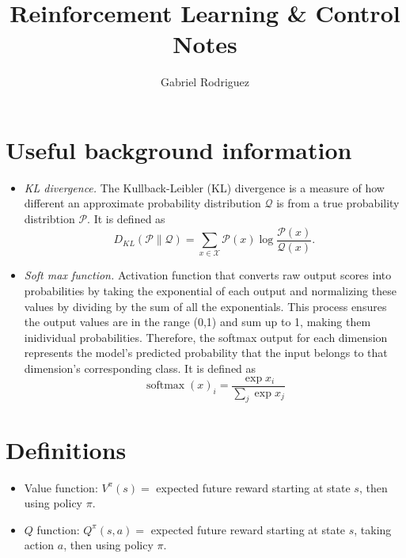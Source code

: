 \documentclass[11pt,a4paper]{article}
\title{Reinforcement Learning \& Control Notes}
\author{Gabriel Rodriguez}
\begin{document}
\maketitle

\section{Useful background information}

\begin{itemize}
    \item \textit{KL divergence.} The Kullback-Leibler (KL) divergence is a measure of how different an approximate probability distribution $\mathcal{Q}$ is from a true probability distribtion $\mathcal{P}$. It is defined as 
    \begin{equation}
      D_{KL}(\mathcal{P} \| \mathcal{Q}) = \sum_{x\in\mathcal{X}} \mathcal{P}(x) \log \frac{\mathcal{P}(x)}{\mathcal{Q}(x)}.
    \end{equation}
    \item \textit{Soft max function.} Activation function that converts raw output scores into probabilities by taking the exponential of each output and normalizing these values by dividing by the sum of all the exponentials. This process ensures the output values are in the range (0,1) and sum up to 1, making them inidividual probabilities. Therefore, the softmax output for each dimension represents the model's predicted probability that the input belongs to that dimension's corresponding class. It is defined as 
    \begin{equation}
      \operatorname{softmax}(x)_i = \frac{\exp{x_i}}{\sum_j \exp{x_j}}
    \end{equation}
\end{itemize}

\section{Definitions}
\begin{itemize}
  \item Value function: $V^\pi(s) = $ expected future reward starting at state $s$, then using policy $\pi$.
  \item $Q$ function: $Q^\pi(s, a) = $ expected future reward starting at state $s$, taking action $a$, then using policy $\pi$.
\end{itemize}

\newpage

\end{document}
